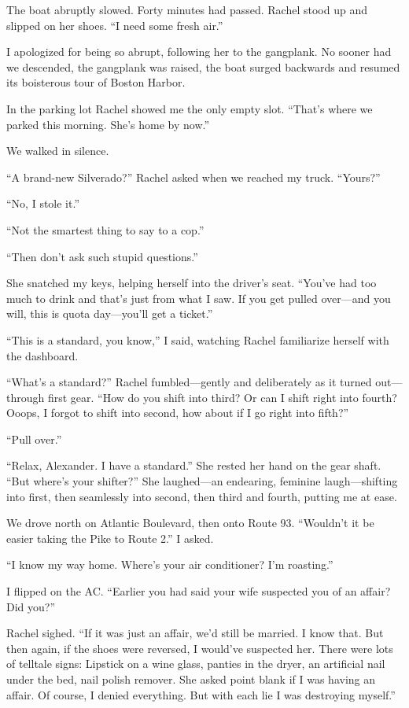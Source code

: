 The boat abruptly slowed. Forty minutes had passed. Rachel stood up and
slipped on her shoes. ``I need some fresh air.''

I apologized for being so abrupt, following her to the gangplank. No
sooner had we descended, the gangplank was raised, the boat surged
backwards and resumed its boisterous tour of Boston Harbor.

In the parking lot Rachel showed me the only empty slot. ``That's where
we parked this morning. She's home by now.''

We walked in silence.

``A brand-new Silverado?'' Rachel asked when we reached my truck.
``Yours?''

``No, I stole it.''

``Not the smartest thing to say to a cop.''

``Then don't ask such stupid questions.''

She snatched my keys, helping herself into the driver's seat. ``You've
had too much to drink and that's just from what I saw. If you get pulled
over---and you will, this is quota day---you'll get a ticket.''

``This is a standard, you know,'' I said, watching Rachel familiarize
herself with the dashboard.

``What's a standard?'' Rachel fumbled---gently and deliberately as it
turned out---through first gear. ``How do you shift into third? Or can I
shift right into fourth? Ooops, I forgot to shift into second, how about
if I go right into fifth?''

``Pull over.''

``Relax, Alexander. I have a standard.'' She rested her hand on the gear
shaft. ``But where's your shifter?'' She laughed---an endearing,
feminine laugh---shifting into first, then seamlessly into second, then
third and fourth, putting me at ease.

We drove north on Atlantic Boulevard, then onto Route 93. ``Wouldn't it
be easier taking the Pike to Route 2.'' I asked.

``I know my way home. Where's your air conditioner? I'm roasting.''

I flipped on the AC. ``Earlier you had said your wife suspected you of
an affair? Did you?''

Rachel sighed. ``If it was just an affair, we'd still be married. I know
that. But then again, if the shoes were reversed, I would've suspected
her. There were lots of telltale signs: Lipstick on a wine glass,
panties in the dryer, an artificial nail under the bed, nail polish
remover. She asked point blank if I was having an affair. Of course, I
denied everything. But with each lie I was destroying myself.''

